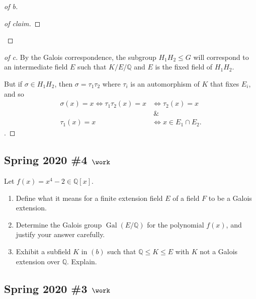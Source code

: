 \begin{solution}
\begin{proof}[of b]
\begin{proof}[of claim]
\end{proof}

\end{proof}

\begin{proof}[of c]

By the Galois correspondence, the subgroup \(H_1H_2 \leq G\) will
correspond to an intermediate field \(E\) such that \(K/E/{\mathbb{Q}}\)
and \(E\) is the fixed field of \(H_1 H_2\).

But if \(\sigma \in H_1 H_2\), then \(\sigma = \tau_1 \tau_2\) where
\(\tau_i\) is an automorphism of \(K\) that fixes \(E_i\), and so
\begin{align*}
\sigma(x) = x \iff \tau_1\tau_2(x) = x
&\iff \tau_2(x) = x 
\\
&~\&~ 
\\
\tau_1(x) = x &\iff x \in E_1 \cap E_2
.\end{align*}
.

\end{proof}

\end{solution}

\hypertarget{spring-2020-4-work}{%
\subsection{\texorpdfstring{Spring 2020 \#4
\(\work\)}{Spring 2020 \#4 \textbackslash work}}\label{spring-2020-4-work}}

Let \(f(x) = x^4-2 \in {\mathbb{Q}}[x]\).

\begin{enumerate}
\def\labelenumi{\alph{enumi}.}
\item
  Define what it means for a finite extension field \(E\) of a field
  \(F\) to be a Galois extension.
\item
  Determine the Galois group \(\operatorname{Gal}(E/{\mathbb{Q}})\) for
  the polynomial \(f(x)\), and justify your answer carefully.
\item
  Exhibit a subfield \(K\) in \((b)\) such that
  \({\mathbb{Q}}\leq K \leq E\) with \(K\) not a Galois extension over
  \({\mathbb{Q}}\). Explain.
\end{enumerate}

\hypertarget{spring-2020-3-work}{%
\subsection{\texorpdfstring{Spring 2020 \#3
\(\work\)}{Spring 2020 \#3 \textbackslash work}}\label{spring-2020-3-work}}

